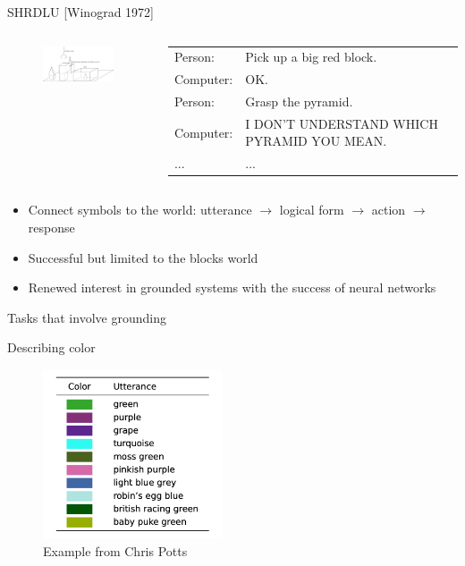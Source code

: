 \documentclass[usenames,dvipsnames,notes]{beamer}
\begin{document}
\begin{frame}
    {SHRDLU [Winograd 1972]}
    \begin{columns}
        \begin{column}{0.3\textwidth}
            \begin{figure}
                \includegraphics[width=4cm]{figures/shrdlu}
            \end{figure}
        \end{column}
        \begin{column}{0.6\textwidth}
            \begin{tabular}{lp{5cm}}
        Person: & Pick up a big red block.\\
        Computer: & OK.\\
        Person: & Grasp the pyramid.\\
        Computer: & I DON'T UNDERSTAND WHICH PYRAMID YOU MEAN.\\
        ... & ...
    \end{tabular}
        \end{column}
        \end{columns}
        \medskip
        \begin{itemize}
            \item Connect symbols to the world: utterance $\to$ logical form $\to$ action $\to$ response   
            \item Successful but limited to the blocks world
            \item Renewed interest in grounded systems with the success of neural networks 
        \end{itemize}
\end{frame}

\begin{frame}
    {Tasks that involve grounding}

    Describing color 
    \vspace{-1em}
    \begin{figure}
        \includegraphics[height=5cm]{figures/color}
        \caption{Example from Chris Potts}
    \end{figure}
\end{frame}
\end{document}
